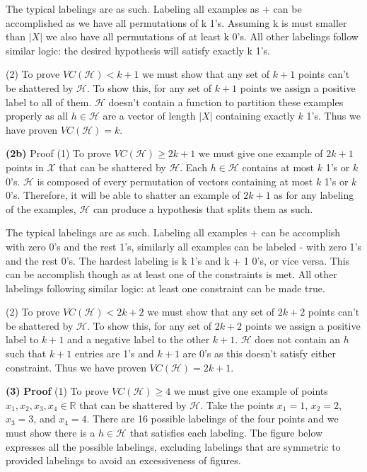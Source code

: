 \documentclass[11pt]{article}
\renewcommand\part[1]{\vspace{.10in}\textbf{(#1)}}
\begin{document}
	The typical labelings are as such. Labeling all examples as + can be accomplished as we have all permutations of k 1's. Assuming k is must smaller than $|X|$ we also have all permutations of at least k 0's. All other labelings follow similar logic: the desired hypothesis will satisfy exactly k 1's.

(2) To prove $VC(\mathcal{H}) < k + 1$ we must show that any set of $k + 1$ points can't be shattered by $\mathcal{H}$. To show this, for any set of $k + 1$ points we assign a positive label to all of them. $\mathcal{H}$ doesn't contain a function to partition these examples properly as all $h \in \mathcal{H}$ are a vector of length $|X|$ containing exactly $k$ 1's. Thus we have proven $VC(\mathcal{H}) = k$.


\part{2b} {Proof} (1) To prove $VC(\mathcal{H}) \geq 2k + 1$ we must give one example of $2k + 1$ points in $\mathcal{X}$ that can be shattered by $\mathcal{H}$. Each $h \in \mathcal{H}$ contains at most $k$ 1's or $k$ 0's. $\mathcal{H}$ is composed of every permutation of vectors containing at most $k$ 1's or $k$ 0's. Therefore, it will be able to shatter an example of $2k + 1$ as for any labeling of the examples, $\mathcal{H}$ can produce a hypothesis that splits them as such. 

	The typical labelings are as such. Labeling all examples + can be accomplish with zero 0's and the rest 1's, similarly all examples can be labeled - with zero 1's and the rest 0's. The hardest labeling is k 1's and k + 1 0's, or vice versa. This can be accomplish though as at least one of the constraints is met. All other labelings following similar logic: at least one constraint can be made true.

(2) To prove $VC(\mathcal{H}) < 2k + 2$ we must show that any set of $2k + 2$ points can't be shattered by $\mathcal{H}$. To show this, for any set of $2k + 2$ points we assign a positive label to $k + 1$ and a negative label to the other $k + 1$. $\mathcal{H}$ does not contain an $h$ such that $k + 1$ entries are 1's and $k + 1$ are 0's as this doesn't satisfy either constraint. Thus we have proven $VC(\mathcal{H}) = 2k + 1$.


\part{3} \textbf{Proof} (1) To prove $VC(\mathcal{H}) \geq 4$ we must give one example of points $x_1, x_2, x_3, x_4 \in \mathbb{R}$ that can be shattered by $\mathcal{H}$. Take the points $x_1 = 1$, $x_2 = 2$, $x_3 = 3$, and $x_4 = 4$. There are 16 possible labelings of the four points and we must show there is a $h \in \mathcal{H}$ that satisfies each labeling. The figure below expresses all the possible labelings, excluding labelings that are symmetric to provided labelings to avoid an excessiveness of figures.
\end{document}
